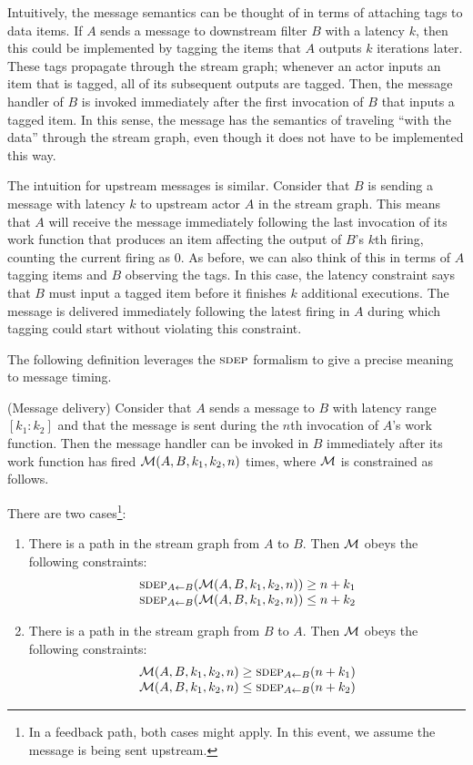 Intuitively, the message semantics can be thought of in terms of
attaching tags to data items.  If $A$ sends a message to downstream
filter $B$ with a latency $k$, then this could be implemented by
tagging the items that $A$ outputs $k$ iterations later.  These tags
propagate through the stream graph; whenever an actor inputs an item
that is tagged, all of its subsequent outputs are tagged.  Then, the
message handler of $B$ is invoked immediately after the first
invocation of $B$ that inputs a tagged item.  In this sense, the
message has the semantics of traveling ``with the data'' through the
stream graph, even though it does not have to be implemented this way.

The intuition for upstream messages is similar.  Consider that $B$ is
sending a message with latency $k$ to upstream actor $A$ in the stream
graph.  This means that $A$ will receive the message immediately
following the last invocation of its work function that produces an
item affecting the output of $B$'s $k$th firing, counting the current
firing as 0.  As before, we can also think of this in terms of $A$
tagging items and $B$ observing the tags.  In this case, the latency
constraint says that $B$ must input a tagged item before it finishes
$k$ additional executions.  The message is delivered immediately
following the latest firing in $A$ during which tagging could start
without violating this constraint.

The following definition leverages the $\textsc{sdep}$ formalism to give a
precise meaning to message timing.

\begin{definition}(Message delivery)
Consider that $A$ sends a message to $B$ with latency range
$[k_1:k_2]$ and that the message is sent during the $n$th invocation
of $A$'s work function.  Then the message handler can be invoked in
$B$ immediately after its work function has fired ${\cal M}(A, B, k_1,
k_2, n)$ times, where ${\cal M}$ is constrained as follows.

There are two cases\footnote{In a feedback path, both cases might apply.  In this event, we assume the message is being sent upstream.}:
\begin{enumerate}

\item There is a path in the stream graph from $A$ to $B$.  Then
${\cal M}$ obeys the following constraints:
\[
\begin{array}{l}
\sdepf{A}{B}({\cal M}(A, B, k_1, k_2, n)) \ge n+k_1\\
\sdepf{A}{B}({\cal M}(A, B, k_1, k_2, n)) \le n+k_2
\end{array}
\]

\item There is a path in the stream graph from $B$ to $A$.  Then
${\cal M}$ obeys the following constraints:
\[
\begin{array}{l}
{\cal M}(A, B, k_1, k_2, n) \ge \sdepf{A}{B}(n + k_1)\\
{\cal M}(A, B, k_1, k_2, n) \le \sdepf{A}{B}(n + k_2)
\end{array}
\]
\end{enumerate}
\end{definition}

